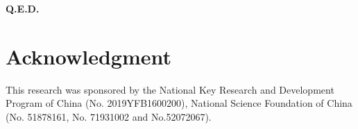 \documentclass[journal]{IEEEtran}
\begin{document}
\textbf{Q.E.D.}


%





\section*{Acknowledgment}


This research was sponsored by the National Key Research and Development Program of China (No. 2019YFB1600200), National Science Foundation of China (No. 51878161, No. 71931002 and No.52072067).


\ifCLASSOPTIONcaptionsoff
  \newpage
\fi
\end{document}
